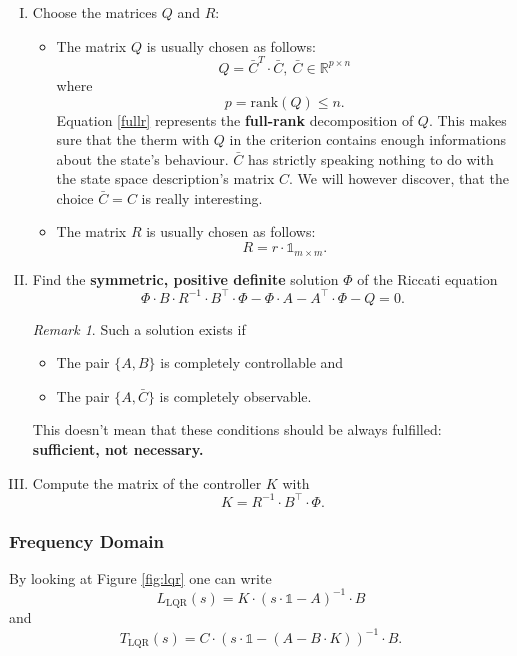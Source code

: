 \documentclass[a4paper,12 pt]{article}
\numberwithin{equation}{section}
\theoremstyle{definition}
\theoremstyle{remark}
\newtheorem*{bmk}{Remark}
\theoremstyle{definition}
\theoremstyle{definition}
\theoremstyle{definition}
\theoremstyle{remark}
\begin{document}
\begin{enumerate}[(I)]
\item Choose the matrices $Q$ and $R$:
\begin{itemize}
\item The matrix $Q$ is usually chosen as follows: 
\begin{equation}
Q=\bar{C}^T\cdot \bar{C}, \ \bar{C}\in \mathbb{R}^{p\times n}
\label{fullr}
\end{equation}
where
\begin{equation}
p=\text{rank}(Q)\leq n.
\end{equation}
Equation \ref{fullr} represents the \textbf{full-rank} decomposition of $Q$. This makes sure that the therm with $Q$ in the criterion contains enough informations about the state's behaviour. $\bar{C}$ has strictly speaking nothing to do with the state space description's matrix $C$. We will however discover, that the choice $\bar{C}=C$ is really interesting.
\item The matrix $R$ is usually chosen as follows:
\begin{equation}
R=r\cdot \mathbb{1}_{m\times m}.
\end{equation}
\end{itemize}
\item Find the \textbf{symmetric, positive definite} solution $\Phi$ of the Riccati equation
\begin{equation}
\Phi\cdot B\cdot R^{-1}\cdot B^\intercal\cdot \Phi-\Phi\cdot A-A^\intercal\cdot \Phi-Q=0.
\end{equation}
\begin{bmk}
Such a solution exists if
\begin{itemize}
\item The pair $\{ A,B\}$ is completely controllable and
\item The pair $\{ A,\bar{C}\}$ is completely observable.
\end{itemize}
This doesn't mean that these conditions should be always fulfilled: \textbf{sufficient, not necessary.}
\end{bmk}
\item Compute the matrix of the controller $K$ with
\begin{equation}
 K=R^{-1}\cdot B^\intercal\cdot \Phi.
\end{equation}
\end{enumerate}
\subsubsection{Frequency Domain}
By looking at Figure \ref{fig:lqr} one can write
\begin{equation}
L_{\text{LQR}}(s)=K\cdot (s\cdot \mathbb{1}-A)^{-1}\cdot B
\end{equation}
and
\begin{equation}
T_{\text{LQR}}(s)=C\cdot (s\cdot \mathbb{1}-(A-B\cdot K))^{-1}\cdot B.
\end{equation}
\end{document}
